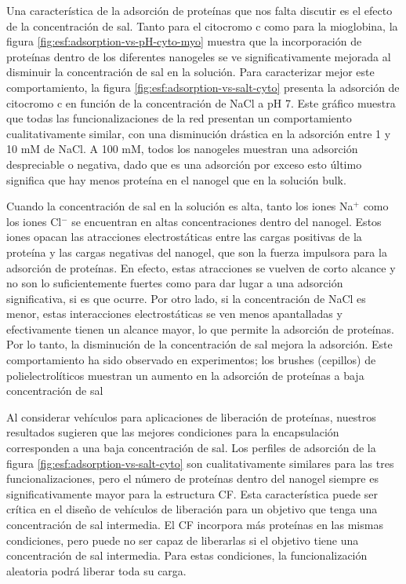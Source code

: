 Una caracter\'istica de la adsorci\'on de prote\'inas que nos falta discutir es el efecto de la concentraci\'on de sal.
Tanto para el citocromo c como para la mioglobina, la figura \ref{fig:esf:adsorption-vs-pH-cyto-myo} muestra que la incorporaci\'on de prote\'inas dentro de los diferentes nanogeles se ve significativamente mejorada al disminuir la concentraci\'on de sal en la soluci\'on.
Para caracterizar mejor este comportamiento, la figura \ref{fig:esf:adsorption-vs-salt-cyto} presenta la adsorci\'on de citocromo c en funci\'on de la concentraci\'on de NaCl a pH 7.
Este gr\'afico muestra que todas las funcionalizaciones de la red presentan un comportamiento cualitativamente similar, con una disminuci\'on dr\'astica en la adsorci\'on entre 1 y 10 mM de NaCl.
A 100 mM, todos los nanogeles muestran una adsorci\'on despreciable o negativa, dado que es una adsorci\'on por exceso esto \'ultimo significa que hay menos prote\'ina en el nanogel que en la soluci\'on bulk.

Cuando la concentraci\'on de sal en la soluci\'on es alta, tanto los iones Na$^+$ como los iones Cl$^-$ se encuentran en altas concentraciones dentro del nanogel.
Estos iones opacan las atracciones electrost\'aticas entre las cargas positivas de la prote\'ina y las cargas negativas del nanogel, que son la fuerza impulsora para la adsorci\'on de prote\'inas.
En efecto, estas atracciones se vuelven de corto alcance y no son lo suficientemente fuertes como para dar lugar a una adsorci\'on significativa, si es que ocurre.
Por otro lado, si la concentraci\'on de NaCl es menor, estas interacciones electrost\'aticas se ven menos apantalladas y efectivamente tienen un alcance mayor, lo que permite la adsorci\'on de prote\'inas.
Por lo tanto, la disminuci\'on de la concentraci\'on de sal mejora la adsorci\'on.
Este comportamiento ha sido observado en experimentos; los brushes (cepillos) de  polielectrol\'iticos muestran un aumento en la adsorci\'on de prote\'inas a baja concentraci\'on de sal \cite{wittemann2006interaction,becker2012proteins, henzler2010adsorption,xu2018interaction}

Al considerar veh\'iculos para aplicaciones de liberaci\'on de prote\'inas, nuestros resultados sugieren que las mejores condiciones para la encapsulaci\'on corresponden a una baja concentraci\'on de sal.
Los perfiles de adsorci\'on de la figura \ref{fig:esf:adsorption-vs-salt-cyto} son cualitativamente similares para las tres funcionalizaciones, pero el n\'umero de prote\'inas dentro del nanogel siempre es significativamente mayor para la estructura CF.
Esta caracter\'istica puede ser cr\'itica en el dise\~no de veh\'iculos de liberaci\'on para un objetivo que tenga una concentraci\'on de sal intermedia.
El CF incorpora m\'as prote\'inas en las mismas condiciones, pero puede no ser capaz de liberarlas si el objetivo tiene una concentraci\'on de sal intermedia.
Para estas condiciones, la funcionalizaci\'on aleatoria podr\'a liberar toda su carga.



